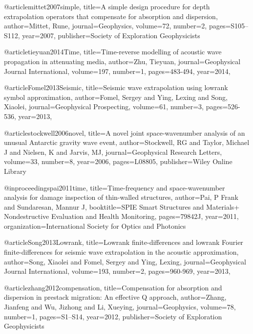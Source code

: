 {@article{mittet2007simple,
  title={A simple design procedure for depth extrapolation operators that compensate for absorption and dispersion},
  author={Mittet, Rune},
  journal={Geophysics},
  volume={72},
  number={2},
  pages={S105--S112},
  year={2007},
  publisher={Society of Exploration Geophysicists}
}

@article{tieyuan2014Time,
  title={Time-reverse modelling of acoustic wave propagation in attenuating media},
  author={Zhu, Tieyuan},
  journal={Geophysical Journal International},
  volume={197},
  number={1},
  pages={483-494},
  year={2014},
}

@article{Fomel2013Seismic,
  title={Seismic wave extrapolation using lowrank symbol approximation},
  author={Fomel, Sergey and Ying, Lexing and Song, Xiaolei},
  journal={Geophysical Prospecting},
  volume={61},
  number={3},
  pages={526-536},
  year={2013},
}

@article{stockwell2006novel,
  title={A novel joint space-wavenumber analysis of an unusual Antarctic gravity wave event},
  author={Stockwell, RG and Taylor, Michael J and Nielsen, K and Jarvis, MJ},
  journal={Geophysical Research Letters},
  volume={33},
  number={8},
  year={2006},
  pages={L08805},
  publisher={Wiley Online Library}
}

@inproceedings{pai2011time,
  title={Time-frequency and space-wavenumber analysis for damage inspection of thin-walled structures},
  author={Pai, P Frank and Sundaresan, Mannur J},
  booktitle={SPIE Smart Structures and Materials+ Nondestructive Evaluation and Health Monitoring},
  pages={79842J},
  year={2011},
  organization={International Society for Optics and Photonics}
}


@article{Song2013Lowrank,
  title={Lowrank finite-differences and lowrank Fourier finite-differences for seismic wave extrapolation in the acoustic approximation},
  author={Song, Xiaolei and Fomel, Sergey and Ying, Lexing},
  journal={Geophysical Journal International},
  volume={193},
  number={2},
  pages={960-969},
  year={2013},
}

@article{zhang2012compensation,
  title={Compensation for absorption and dispersion in prestack migration: {A}n effective {Q} approach},
  author={Zhang, Jianfeng and Wu, Jizhong and Li, Xueying},
  journal={Geophysics},
  volume={78},
  number={1},
  pages={S1--S14},
  year={2012},
  publisher={Society of Exploration Geophysicists}
}

}
